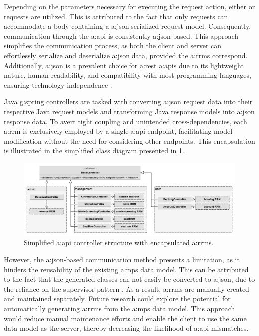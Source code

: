 Depending on the parameters necessary for executing the request action, either  or  requests are utilized. This is attributed to the fact that only  requests can accommodate a body containing a \gls{a:json}-serialized request model. Consequently, communication through the \gls{a:api} is consistently \gls{a:json}-based. This approach simplifies the communication process, as both the client and server can effortlessly serialize and deserialize \gls{a:json} data, provided the \glspl{a:rrm} correspond. Additionally, \gls{a:json} is a prevalent choice for \gls{a:rest} \glspl{a:api} due to its lightweight nature, human readability, and compatibility with most programming languages, ensuring technology independence \cite{rfc8259}.

Java \gls{g:spring} controllers are tasked with converting \gls{a:json} request data into their respective Java request models and transforming Java response models into \gls{a:json} response data. To avert tight coupling and unintended cross-dependencies, each \gls{a:rrm} is exclusively employed by a single \gls{a:api} endpoint, facilitating model modification without the need for considering other endpoints. This encapsulation is illustrated in the simplified class diagram presented in \cref{fig:api-controllers}.

\begin{figure}[H]
\centering
\includegraphics[width=\textwidth]{images/api-controllers}
\caption{Simplified \gls{a:api} controller structure with encapsulated \glspl{a:rrm}.}
\label{fig:api-controllers}
\end{figure}

However, the \gls{a:json}-based communication method presents a limitation, as it hinders the reusability of the existing \gls{a:mps} data model. This can be attributed to the fact that the generated classes can not easily be converted to \gls{a:json}, due to the reliance on the supervisor pattern \cite[44--45]{IIS2}. As a result, \glspl{a:rrm} are manually created and maintained separately. Future research could explore the potential for automatically generating \glspl{a:rrm} from the \gls{a:mps} data model. This approach would reduce manual maintenance efforts and enable the client to use the same data model as the server, thereby decreasing the likelihood of \gls{a:api} mismatches.

